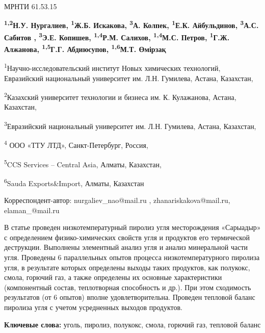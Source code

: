 \newpage
МРНТИ 61.53.15


\begin{center}
{\bfseries \textsuperscript{1,2}Н.У. Нургалиев, \textsuperscript{1}Ж.Б. Искакова, \textsuperscript{3}А. Колпек, \textsuperscript{1}Е.К. Айбульдинов, \textsuperscript{3}А.С. Сабитов , \textsuperscript{3}Э.Е. Копишев, \textsuperscript{1,4}Р.М. Салихов, \textsuperscript{1,4}М.С. Петров, \textsuperscript{1}Г.Ж. Алжанова, \textsuperscript{1,5}Г.Г. Абдиюсупов, \textsuperscript{1,6}М.Т. Өмірзақ}

\textsuperscript{1}Научно-исследовательский институт Новых химических
технологий, Евразийский национальный университет им. Л.Н. Гумилева,
Астана, Казахстан,

\textsuperscript{2}Казахский университет технологии и бизнеса им. К.
Кулажанова, Астана, Казахстан,

\textsuperscript{3}Евразийский национальный университет им. Л.Н.
Гумилева, Астана, Казахстан,

\textsuperscript{4} ООО «ТТУ ЛТД», Санкт-Петербург, Россия,

\textsuperscript{5}CCS Services -- Central Asia, Алматы, Казахстан,

\textsuperscript{6}Sauda Exports\&Import, Алматы, Казахстан

Корреспондент-автор: nurgaliev\_nao@mail.ru , zhanariskakova@mail.ru,
elaman\_@mail.ru
\end{center}

В статье проведен низкотемпературный пиролиз угля месторождения
«Сарыадыр» с определением физико-химических свойств угля и продуктов его
термической деструкции. Выполнены элементный анализ угля и анализ
минеральной части угля. Проведены 6 параллельных опытов процесса
низкотемпературного пиролиза угля, в результате которых определены
выходы таких продуктов, как полукокс, смола, горючий газ, а также
определены их основные характеристики (компонентный состав, теплотворная
способность и др.). При этом сходимость результатов (от 6 опытов) вполне
удовлетворительна. Проведен тепловой баланс пиролиза угля с учетом
усредненных выходов продуктов.

{\bfseries Ключевые слова:} уголь, пиролиз, полукокс, смола, горючий газ,
тепловой баланс

